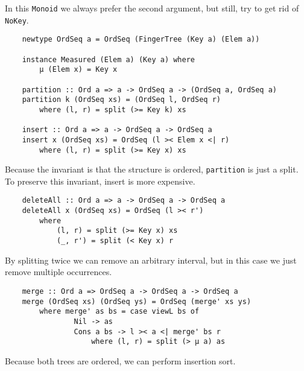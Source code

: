 In this \texttt{Monoid} we always prefer the second argument, but still, try to get rid of \texttt{NoKey}.

\begin{verbatim}
    newtype OrdSeq a = OrdSeq (FingerTree (Key a) (Elem a))

    instance Measured (Elem a) (Key a) where
        μ (Elem x) = Key x
        
    partition :: Ord a => a -> OrdSeq a -> (OrdSeq a, OrdSeq a)
    partition k (OrdSeq xs) = (OrdSeq l, OrdSeq r)
        where (l, r) = split (>= Key k) xs

    insert :: Ord a => a -> OrdSeq a -> OrdSeq a
    insert x (OrdSeq xs) = OrdSeq (l >< Elem x <| r)
        where (l, r) = split (>= Key x) xs
\end{verbatim}

Because the invariant is that the structure is ordered, \texttt{partition} is just a split. To preserve this invariant, insert is more expensive.

\begin{verbatim}
    deleteAll :: Ord a => a -> OrdSeq a -> OrdSeq a
    deleteAll x (OrdSeq xs) = OrdSeq (l >< r')
        where
            (l, r) = split (>= Key x) xs
            (_, r') = split (< Key x) r
\end{verbatim}

By splitting twice we can remove an arbitrary interval, but in this case we just remove multiple occurrences.

\begin{verbatim}
    merge :: Ord a => OrdSeq a -> OrdSeq a -> OrdSeq a
    merge (OrdSeq xs) (OrdSeq ys) = OrdSeq (merge' xs ys)
        where merge' as bs = case viewL bs of
                Nil -> as
                Cons a bs -> l >< a <| merge' bs r
                    where (l, r) = split (> μ a) as
\end{verbatim}

Because both trees are ordered, we can perform insertion sort.